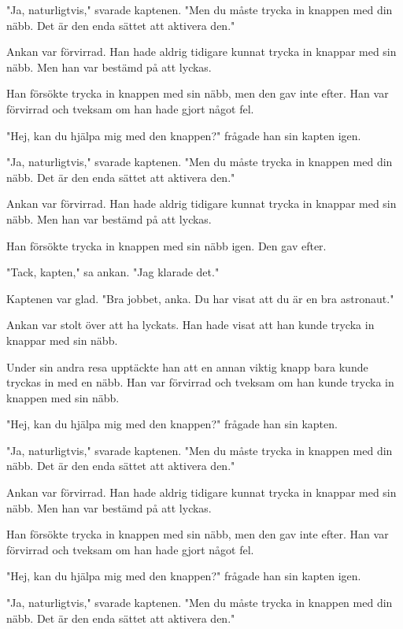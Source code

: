 \documentclass[10pt]{article}
\begin{document}
{\begin{minipage}{\textwidth}
\par\smallskip
"Ja, naturligtvis," svarade kaptenen. "Men du måste trycka in knappen med din näbb. Det är den enda sättet att aktivera den."
\par\smallskip
Ankan var förvirrad. Han hade aldrig tidigare kunnat trycka in knappar med sin näbb. Men han var bestämd på att lyckas.
\par\smallskip
Han försökte trycka in knappen med sin näbb, men den gav inte efter. Han var förvirrad och tveksam om han hade gjort något fel.
\par\smallskip
"Hej, kan du hjälpa mig med den knappen?" frågade han sin kapten igen.
\par\smallskip
"Ja, naturligtvis," svarade kaptenen. "Men du måste trycka in knappen med din näbb. Det är den enda sättet att aktivera den."
\par\smallskip
Ankan var förvirrad. Han hade aldrig tidigare kunnat trycka in knappar med sin näbb. Men han var bestämd på att lyckas.
\par\smallskip
Han försökte trycka in knappen med sin näbb igen. Den gav efter.
\par\smallskip
"Tack, kapten," sa ankan. "Jag klarade det."
\par\smallskip
Kaptenen var glad. "Bra jobbet, anka. Du har visat att du är en bra astronaut."
\par\smallskip
Ankan var stolt över att ha lyckats. Han hade visat att han kunde trycka in knappar med sin näbb.
\par\smallskip
Under sin andra resa upptäckte han att en annan viktig knapp bara kunde tryckas in med en näbb. Han var förvirrad och tveksam om han kunde trycka in knappen med sin näbb.
\par\smallskip
"Hej, kan du hjälpa mig med den knappen?" frågade han sin kapten.
\par\smallskip
"Ja, naturligtvis," svarade kaptenen. "Men du måste trycka in knappen med din näbb. Det är den enda sättet att aktivera den."
\par\smallskip
Ankan var förvirrad. Han hade aldrig tidigare kunnat trycka in knappar med sin näbb. Men han var bestämd på att lyckas.
\par\smallskip
Han försökte trycka in knappen med sin näbb, men den gav inte efter. Han var förvirrad och tveksam om han hade gjort något fel.
\par\smallskip
"Hej, kan du hjälpa mig med den knappen?" frågade han sin kapten igen.
\par\smallskip
"Ja, naturligtvis," svarade kaptenen. "Men du måste trycka in knappen med din näbb. Det är den enda sättet att aktivera den."

\end{minipage}}
\end{document}
